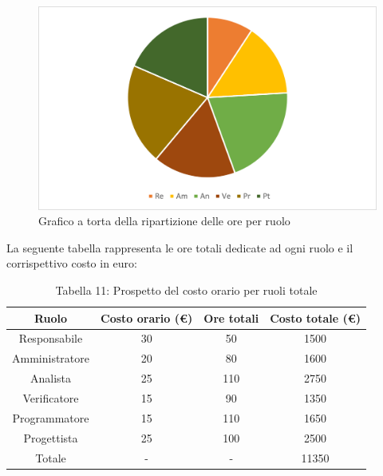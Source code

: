 \begin{figure}[H]
    \centering
    \includegraphics[scale=0.6]{img/grafi preventivo/torta/totale/totale.png}
    \caption{Grafico a torta della ripartizione delle ore per ruolo}
\end{figure}
La seguente tabella rappresenta le ore totali dedicate ad ogni ruolo e il corrispettivo costo in euro:
\begin{table}[h]
	\setlength\extrarowheight{5pt}
	\centering
	\begin{tabularx}{\textwidth}{|ccc|c|}
		\hline
		\rowcolor{white}
		\textbf{Ruolo} & \textbf{Costo orario (€)} & \textbf{Ore totali} & \textbf{Costo totale (€)} \\
		\hline
		Responsabile &30&50&1500 \\
		Amministratore &20&80&1600 \\
		Analista &25&110&2750 \\
		Verificatore &15&90&1350 \\
		Programmatore &15&110&1650 \\
		Progettista &25&100&2500 \\
		\hline
		Totale &-&-&11350 \\
		\hline
	\end{tabularx}
    \vspace{10pt}
	\caption{Tabella 11: Prospetto del costo orario per ruoli totale}
\end{table}
